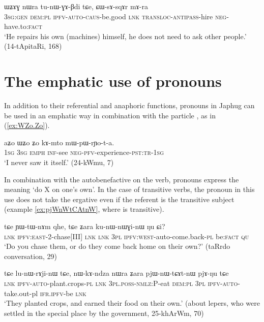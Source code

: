 \begin{exe}
\ex \label{ex:WZAG.nWra}
\gll ɯʑɤɣ nɯra tu-nɯ-ɣɤ-βdi tɕe, ɕɯ-sɤ-sqɤr mɤ-ra \\
\textsc{3sg:gen} \textsc{dem:pl} \textsc{ipfv-auto-caus}-be.good \textsc{lnk} \textsc{transloc-antipass}-hire \textsc{neg}-have.to:\textsc{fact} \\
\glt `He repairs his own (machines) himself, he does not need to ask other people.' (14-tApitaRi, 168)
\end{exe} 

\section{The emphatic use of pronouns} \label{sec:pronouns.emph}
In addition to their referential and anaphoric functions, pronouns in Japhug can be used in an emphatic way in combination with the particle , as in  (\ref{ex:WZo.Zo}).

\begin{exe}
\ex \label{ex:WZo.Zo}
\gll aʑo ɯʑo ʑo kɤ-mto mɯ-pɯ-rɲo-t-a. \\
\textsc{1sg} \textsc{3sg} \textsc{emph} \textsc{inf}-see \textsc{neg-pfv}-experience-\textsc{pst:tr-1sg} \\
\glt `I never saw it itself.' (24-kWmu, 7)
\end{exe} 

In combination with the autobenefactive  on the verb, pronouns express the meaning `do X on one's own'. In the case of transitive verbs, the pronoun in this use does not take the ergative even if the referent is the transitive subject (example \ref{ex:pjWnWtCAtnW}, where  is transitive).

\begin{exe}
\ex
\gll tɕe ɲɯ-tɯ-nɤm qhe, tɕe ʑara ku-nɯ-nɯɣi-nɯ ŋu ɕi? \\
\textsc{lnk} \textsc{ipfv:east}-2-chase[III] \textsc{lnk} \textsc{lnk} \textsc{3pl} \textsc{ipfv:west}-auto-come.back-\textsc{pl} be:\textsc{fact} \textsc{qu} \\
\glt `Do you chase them, or do they come back home on their own?' (taRrdo conversation, 29)
\end{exe} 

\begin{exe}
\ex \label{ex:pjWnWtCAtnW}
\gll tɕe lu-nɯ-rɤji-nɯ tɕe, nɯ-kɤ-ndza nɯra ʑara pjɯ-nɯ-tɕɤt-nɯ pjɤ-ŋu tɕe \\
\textsc{lnk} \textsc{ipfv-auto}-plant.crops-\textsc{pl} \textsc{lnk} \textsc{3pl.poss-nmlz:P}-eat \textsc{dem:pl} \textsc{3pl} \textsc{ipfv-auto}-take.out-pl \textsc{ifr.ipfv}-be \textsc{lnk} \\
\glt `They planted crops, and earned their food on their own.' (about lepers, who were settled in the special place by the government, 25-khArWm, 70)
\end{exe}

